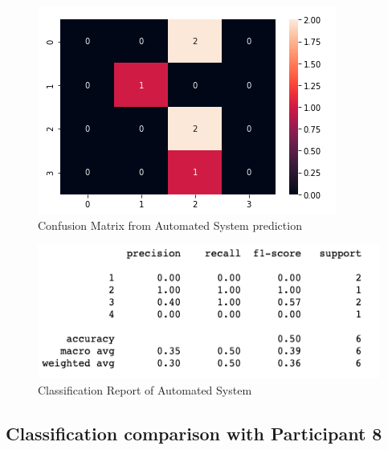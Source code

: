 \pagebreak

\begin{figure}[!htp]
    \includegraphics[width=\textwidth]{Images/a7.png}
    \caption{Confusion Matrix from Automated System prediction}
    \label{fig:f11}
\end{figure}

\begin{figure}[!htp]
    \includegraphics[width=\textwidth]{Images/a7r.png}
    \caption{Classification Report of Automated System}
    \label{fig:f11}
\end{figure}


\pagebreak
\subsection*{Classification comparison with Participant 8}

